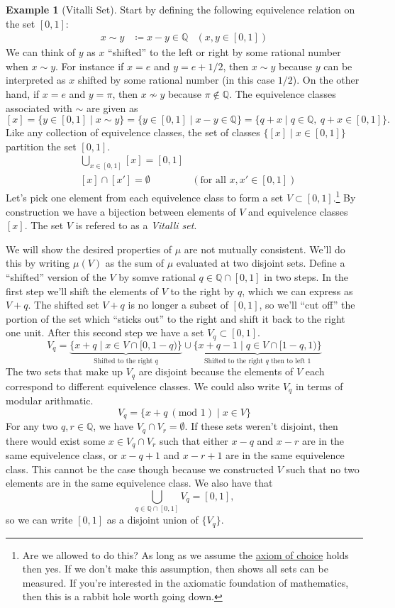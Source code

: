 \documentclass{article}
\newcommand{\Q}{\mathbb{Q}}
\theoremstyle{definition}
\newtheorem{example}{Example}[section]
\begin{document}
	\begin{example}[Vitalli Set]
	Start by defining the following equivelence relation on the set $[0,1]$:
\begin{align*}
	x\sim y & \coloneqq x-y\in\Q &(x,y\in[0,1])
\end{align*}We can think of $y$ as $x$ ``shifted'' to the left or right by some rational number when $x\sim y$. For instance if $x = e$ and $y = e + 1/2$, then $x\sim y$ because $y$ can be interpreted as $x$ shifted by some rational number (in this case $1/2$). On the other hand, if $x=e$ and $y = \pi$, then $x\not\sim y$ because $\pi \notin \Q$. The equivelence classes associated with $\sim$ are given as 
$$ [x] = \{y\in[0,1] \mid x\sim y\} = \{y\in[0,1]\mid x-y\in \Q\} = \{q + x \mid q\in \Q,\ q+x\in[0,1] \}.$$ Like any collection of equivelence classes, the set of classes $\{[x]\mid x\in[0,1]\}$ partition the set $[0,1]$.
\begin{align*}
	&\bigcup_{x\in[0,1]}[x] = [0,1]\\
	&[x]\cap[x']  = \emptyset & (\text{for all }x,x'\in [0,1])
\end{align*}
Let's pick one element from each equivelence class to form a set $V\subset [0,1]$.\footnote{Are we allowed to do this? As long as we assume the \href{https://plato.stanford.edu/entries/axiom-choice/}{axiom of choice} holds then yes. If we don't make this assumption, then \cite{solovay1970model} shows all sets can be measured. If you're interested in the axiomatic foundation of mathematics, then this is a rabbit hole worth going down.} By construction we have a bijection between elements of $V$ and equivelence classes $[x]$. The set $V$ is refered to as a \textit{Vitalli set}. 

We will show the desired properties of $\mu$ are not mutually consistent. We'll do this by writing $\mu(V)$ as the sum of $\mu$ evaluated at two disjoint sets. Define a ``shifted'' version of the $V$ by somve rational $q\in \Q\cap[0,1]$ in two steps. In the first step we'll shift the elements of $V$ to the right by $q$, which we can express as $V+q$.  The shifted set $V+q$ is no longer a subset of $[0,1]$, so we'll ``cut off'' the portion of the set which ``sticks out'' to the right and shift it back to the right one unit. After this second step we have a set $V_q\subset[0,1]$. 
$$ V_q =\underbrace{ \{x+q \mid x\in V\cap [0,1-q)\}}_{\text{Shifted to the right } q} \cup \underbrace{ \{x+q-1 \mid q\in V\cap [1-q,1)\} }_{\text{Shifted to the right } q\text{ then to left }1} $$ The two sets that make up $V_q$ are disjoint because the elements of $V$ each correspond to different equivelence classes. We could also write $V_q$ in terms of modular arithmatic. 
$$ V_q = \{x+q\ (\text{mod }1)\mid x\in V\}$$ For any two $q,r\in \Q$, we have $V_q\cap V_r = \emptyset$. If these sets weren't disjoint, then there would exist some $x\in V_q\cap V_r$ such that either $x-q$ and $x-r$ are in the same equivelence class, or $x-q+1$ and $x-r+1$ are in the same equivelence class. This cannot be the case though because we constructed $V$ such that no two elements are in the same equivelence class. We also have that $$ \bigcup_{q\in\Q\cap[0,1]} V_q=[0,1],$$ so we can write $[0,1]$ as a disjoint union of $\{V_q\}$.


\end{example}
\end{document}
